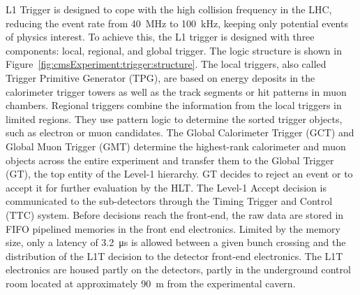 L1 Trigger is designed to cope with the high collision frequency in the LHC, reducing the event rate from 40~MHz to 100~kHz, keeping only potential events of physics interest. To achieve this, the L1 trigger is designed with three components: local, regional, and global trigger. The logic structure is shown in Figure~\ref{fig:cmsExperiment:trigger:structure}. The local triggers, also called Trigger Primitive Generator (TPG), are based on energy deposits in the calorimeter trigger towers as well as the track segments or hit patterns in muon chambers. Regional triggers combine the information from the local triggers in limited regions. They use pattern logic to determine the sorted trigger objects, such as electron or muon candidates. The  Global Calorimeter Trigger (GCT) and Global Muon Trigger (GMT) determine the highest-rank calorimeter and muon objects across the entire experiment and transfer them to the Global Trigger (GT), the top entity of the Level-1 hierarchy. GT decides to reject an event or to accept it for further evaluation by the HLT. The Level-1 Accept decision is communicated to the sub-detectors through the  Timing Trigger and Control (TTC) system. Before decisions reach the front-end, the raw data are stored in FIFO pipelined memories in the front end electronics. Limited by the memory size, only a latency of \SI{3.2}{\us} is allowed between a given bunch crossing and the distribution of the L1T decision to the detector front-end electronics. The L1T electronics are housed partly on the detectors, partly in the underground control room located at approximately 90~m from the experimental cavern.


    

